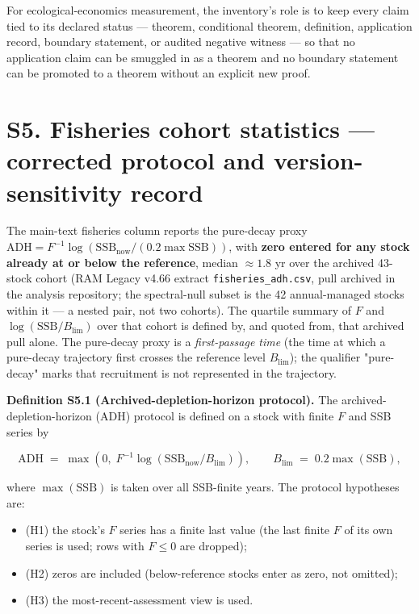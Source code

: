 \documentclass[11pt]{article}
\begin{document}
For ecological-economics measurement, the inventory's role is to keep every claim tied to its declared status --- theorem, conditional theorem, definition, application record, boundary statement, or audited negative witness --- so that no application claim can be smuggled in as a theorem and no boundary statement can be promoted to a theorem without an explicit new proof.

\vspace{0.8em}

\section*{S5. Fisheries cohort statistics --- corrected protocol and version-sensitivity record}\label{s5-fisheries-cohort-statistics-----corrected-protocol-and-version-sens}

The main-text fisheries column reports the pure-decay proxy \(\mathrm{ADH} = F^{-1}\log(\mathrm{SSB}_{\mathrm{now}}/(0.2\max\mathrm{SSB}))\), with \textbf{zero entered for any stock already at or below the reference}, median \(\approx 1.8\) yr over the archived 43-stock cohort (RAM Legacy v4.66 extract \texttt{fisheries\_adh.csv}, pull archived in the analysis repository; the spectral-null subset is the 42 annual-managed stocks within it --- a nested pair, not two cohorts). The quartile summary of \(F\) and \(\log(\mathrm{SSB}/B_{\lim})\) over that cohort is defined by, and quoted from, that archived pull alone. The pure-decay proxy is a \emph{first-passage time} (the time at which a pure-decay trajectory first crosses the reference level \(B_{\lim}\)); the qualifier "pure-decay" marks that recruitment is not represented in the trajectory.

\textbf{Definition S5.1 (Archived-depletion-horizon protocol).} The archived-depletion-horizon (ADH) protocol is defined on a stock with finite \(F\) and SSB series by

\[ \mathrm{ADH} \;=\; \max\!\left(0,\; F^{-1}\log\!\left(\mathrm{SSB}_{\mathrm{now}}/B_{\lim}\right)\right), \qquad B_{\lim} \;=\; 0.2\max(\mathrm{SSB}), \]

where \(\max(\mathrm{SSB})\) is taken over all SSB-finite years. The protocol hypotheses are:

\begin{itemize}\setlength{\itemsep}{2pt}
\item (H1) the stock's \(F\) series has a finite last value (the last finite \(F\) of its own series is used; rows with \(F \le 0\) are dropped);
\item (H2) zeros are included (below-reference stocks enter as zero, not omitted);
\item (H3) the most-recent-assessment view is used.
\end{itemize}
\end{document}
